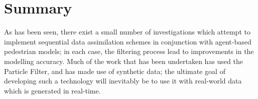 



\section{Summary}\label{sec:lit_rev:summary}



As has been seen, there exist a small number of investigations which attempt to
implement sequential data assimilation schemes in conjunction with agent-based
pedestrian models; in each case, the filtering process lead to improvements in
the modelling accuracy.
Much of the work that has been undertaken has used the Particle Filter, and has
made use of synthetic data; the ultimate goal of developing such a technology
will inevitably be to use it with real-world data which is generated in
real-time.

